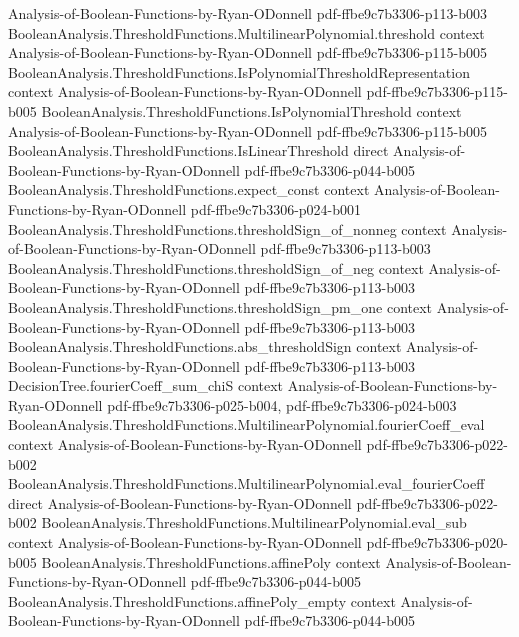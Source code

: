 \begin{lemma}
  {Analysis-of-Boolean-Functions-by-Ryan-ODonnell}
  {pdf-ffbe9c7b3306-p113-b003}
\proofstep
  {BooleanAnalysis.ThresholdFunctions.MultilinearPolynomial.threshold}
  {context}
  {Analysis-of-Boolean-Functions-by-Ryan-ODonnell}
  {pdf-ffbe9c7b3306-p115-b005}
\proofstep
  {BooleanAnalysis.ThresholdFunctions.IsPolynomialThresholdRepresentation}
  {context}
  {Analysis-of-Boolean-Functions-by-Ryan-ODonnell}
  {pdf-ffbe9c7b3306-p115-b005}
\proofstep
  {BooleanAnalysis.ThresholdFunctions.IsPolynomialThreshold}
  {context}
  {Analysis-of-Boolean-Functions-by-Ryan-ODonnell}
  {pdf-ffbe9c7b3306-p115-b005}
\proofstep
  {BooleanAnalysis.ThresholdFunctions.IsLinearThreshold}
  {direct}
  {Analysis-of-Boolean-Functions-by-Ryan-ODonnell}
  {pdf-ffbe9c7b3306-p044-b005}
\proofstep
  {BooleanAnalysis.ThresholdFunctions.expect_const}
  {context}
  {Analysis-of-Boolean-Functions-by-Ryan-ODonnell}
  {pdf-ffbe9c7b3306-p024-b001}
\proofstep
  {BooleanAnalysis.ThresholdFunctions.thresholdSign_of_nonneg}
  {context}
  {Analysis-of-Boolean-Functions-by-Ryan-ODonnell}
  {pdf-ffbe9c7b3306-p113-b003}
\proofstep
  {BooleanAnalysis.ThresholdFunctions.thresholdSign_of_neg}
  {context}
  {Analysis-of-Boolean-Functions-by-Ryan-ODonnell}
  {pdf-ffbe9c7b3306-p113-b003}
\proofstep
  {BooleanAnalysis.ThresholdFunctions.thresholdSign_pm_one}
  {context}
  {Analysis-of-Boolean-Functions-by-Ryan-ODonnell}
  {pdf-ffbe9c7b3306-p113-b003}
\proofstep
  {BooleanAnalysis.ThresholdFunctions.abs_thresholdSign}
  {context}
  {Analysis-of-Boolean-Functions-by-Ryan-ODonnell}
  {pdf-ffbe9c7b3306-p113-b003}
\proofstep
  {DecisionTree.fourierCoeff_sum_chiS}
  {context}
  {Analysis-of-Boolean-Functions-by-Ryan-ODonnell}
  {pdf-ffbe9c7b3306-p025-b004,
    pdf-ffbe9c7b3306-p024-b003}
\proofstep
  {BooleanAnalysis.ThresholdFunctions.MultilinearPolynomial.fourierCoeff_eval}
  {context}
  {Analysis-of-Boolean-Functions-by-Ryan-ODonnell}
  {pdf-ffbe9c7b3306-p022-b002}
\proofstep
  {BooleanAnalysis.ThresholdFunctions.MultilinearPolynomial.eval_fourierCoeff}
  {direct}
  {Analysis-of-Boolean-Functions-by-Ryan-ODonnell}
  {pdf-ffbe9c7b3306-p022-b002}
\proofstep
  {BooleanAnalysis.ThresholdFunctions.MultilinearPolynomial.eval_sub}
  {context}
  {Analysis-of-Boolean-Functions-by-Ryan-ODonnell}
  {pdf-ffbe9c7b3306-p020-b005}
\proofstep
  {BooleanAnalysis.ThresholdFunctions.affinePoly}
  {context}
  {Analysis-of-Boolean-Functions-by-Ryan-ODonnell}
  {pdf-ffbe9c7b3306-p044-b005}
\proofstep
  {BooleanAnalysis.ThresholdFunctions.affinePoly_empty}
  {context}
  {Analysis-of-Boolean-Functions-by-Ryan-ODonnell}
  {pdf-ffbe9c7b3306-p044-b005}

\end{lemma}
